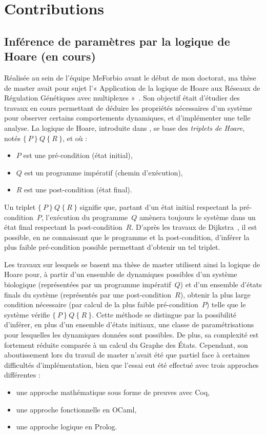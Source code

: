 \chapter{Contributions}

\newcommand{\hoare}[3]{\{\ #1\ \}\ #2\ \{\ #3\ \}}

\section{Inférence de paramètres par la logique de Hoare \normalsize(en cours)}
\label{sec:hoare}

Réalisée au sein de l'équipe MeForbio avant le début de mon doctorat, ma thèse de master avait pour sujet l'« Application de la logique de Hoare aux Réseaux de Régulation Génétiques avec multiplexes »~\cite{Folschette2011}.
Son objectif était d'étudier des travaux en cours permettant de déduire les propriétés nécessaires d'un système pour observer certains comportements dynamiques, et d'implémenter une telle analyse.
La logique de Hoare, introduite dans \cite{hoare-69}, se base des \emph{triplets de Hoare}, notés $\hoare{P}{Q}{R}$, et où :
\begin{itemize}
  \item $P$ est une pré-condition (état initial),
  \item $Q$ est un programme impératif (chemin d'exécution),
  \item $R$ est une post-condition (état final).
\end{itemize}
Un triplet $\hoare{P}{Q}{R}$ signifie que, partant d'un état initial respectant la pré-condition~$P$, l'exécution du programme~$Q$ amènera toujours le système dans un état final respectant la post-condition~$R$.
D'après les travaux de Dijkstra~\cite{dijkstra-75}, il est possible, en ne connaissant que le programme et la post-condition,
d'inférer la plus faible pré-condition possible permettant d'obtenir un tel triplet.

Les travaux sur lesquels se basent ma thèse de master utilisent ainsi la logique de Hoare pour,
à partir d'un ensemble de dynamiques possibles d'un système biologique (représentées par un programme impératif~$Q$)
et d'un ensemble d'états finals du système (représentés par une post-condition~$R$),
obtenir la plus large condition nécessaire (par calcul de la plus faible pré-condition~$P$)
telle que le système vérifie $\hoare{P}{Q}{R}$.
Cette méthode se distingue par la possibilité d'inférer, en plus d'un ensemble d'états initiaux, une classe de paramétrisations pour lesquelles les dynamiques données sont possibles.
De plus, sa complexité est fortement réduite comparée à un calcul du Graphe des États.
Cependant, son aboutissement lors du travail de master n'avait été que partiel face à certaines difficultés d'implémentation, bien que l'essai eut été effectué avec trois approches différentes :
\begin{itemize}
  \item une approche mathématique sous forme de preuves avec Coq,
  \item une approche fonctionnelle en OCaml,
  \item une approche logique en Prolog.
\end{itemize}


